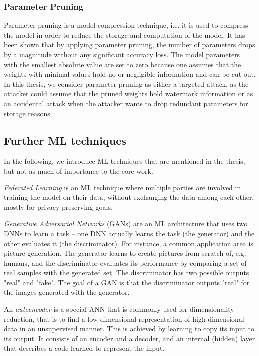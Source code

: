\subsubsection{Parameter Pruning}
Parameter pruning \cite{han_learning_2015} is a model compression technique, i.e. it is used to compress the model in order to reduce the storage and computation of the model. It has been shown that by applying parameter pruning, the number of parameters drops by a magnitude without any significant accuracy loss. The model parameters with the smallest absolute value are set to zero because one assumes that the weights with minimal values hold no or negligible information and can be cut out. In this thesis, we consider parameter pruning as either a targeted attack, as the attacker could assume that the pruned weights hold watermark information or as an accidental attack when the attacker wants to drop redundant parameters for storage reasons.

\subsection{Further ML techniques}
In the following, we introduce ML techniques that are mentioned in the thesis, but not as much of importance to the core work.

\textit{Federated Learning} \cite{yang_federated_2019} is an ML technique where multiple parties are involved in training the model on their data, without exchanging the data among each other, mostly for privacy-preserving goals.

\textit{Generative Adversarial Networks} (GANs) \cite{goodfellow_generative_2014} are an ML architecture that uses two DNNs to learn a task -- one DNN actually learns the task (the generator) and the other evaluates it (the discriminator). For instance, a common application area is picture generation. The generator learns to create pictures from scratch of, e.g. humans, and the discriminator evaluates its performance by comparing a set of real samples with the generated set. The discriminator has two possible outputs "real" and "fake". The goal of a GAN is that the discriminator outputs "real" for the images generated with the generator.


An \textit{autoencoder} is a special ANN that is commonly used for dimensionality reduction, that is to find a low-dimensional representation of high-dimensional data in an unsupervised manner. This is achieved by learning to copy its input to its output. It consists of an encoder and a decoder, and an internal (hidden) layer that describes a code learned to represent the input.

